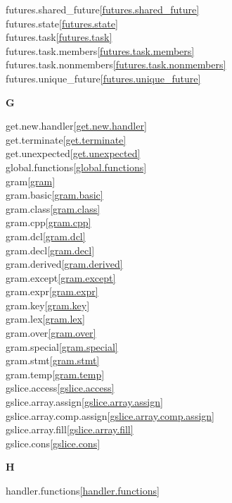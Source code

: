 \begin{multicols}{2}
futures.shared_future\quad\ref{futures.shared_future}\\
futures.state\quad\ref{futures.state}\\
futures.task\quad\ref{futures.task}\\
futures.task.members\quad\ref{futures.task.members}\\
futures.task.nonmembers\quad\ref{futures.task.nonmembers}\\
futures.unique_future\quad\ref{futures.unique_future}\\
\par \textbf{G}\par
get.new.handler\quad\ref{get.new.handler}\\
get.terminate\quad\ref{get.terminate}\\
get.unexpected\quad\ref{get.unexpected}\\
global.functions\quad\ref{global.functions}\\
gram\quad\ref{gram}\\
gram.basic\quad\ref{gram.basic}\\
gram.class\quad\ref{gram.class}\\
gram.cpp\quad\ref{gram.cpp}\\
gram.dcl\quad\ref{gram.dcl}\\
gram.decl\quad\ref{gram.decl}\\
gram.derived\quad\ref{gram.derived}\\
gram.except\quad\ref{gram.except}\\
gram.expr\quad\ref{gram.expr}\\
gram.key\quad\ref{gram.key}\\
gram.lex\quad\ref{gram.lex}\\
gram.over\quad\ref{gram.over}\\
gram.special\quad\ref{gram.special}\\
gram.stmt\quad\ref{gram.stmt}\\
gram.temp\quad\ref{gram.temp}\\
gslice.access\quad\ref{gslice.access}\\
gslice.array.assign\quad\ref{gslice.array.assign}\\
gslice.array.comp.assign\quad\ref{gslice.array.comp.assign}\\
gslice.array.fill\quad\ref{gslice.array.fill}\\
gslice.cons\quad\ref{gslice.cons}\\
\par \textbf{H}\par
handler.functions\quad\ref{handler.functions}\\

\end{multicols}
